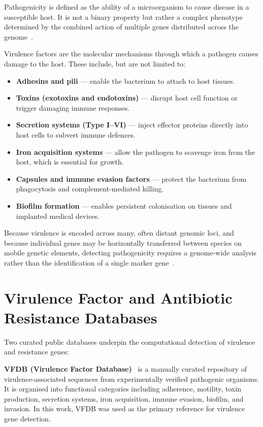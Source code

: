 Pathogenicity is defined as the ability of a microorganism to cause disease in a
susceptible host. It is not a binary property but rather a complex phenotype
determined by the combined action of multiple genes distributed across the
genome~\cite{TODO_pathogenicity_definition}.

Virulence factors are the molecular mechanisms through which a pathogen causes
damage to the host. These include, but are not limited to:

\begin{itemize}
    \item \textbf{Adhesins and pili} — enable the bacterium to attach to host tissues.
    \item \textbf{Toxins (exotoxins and endotoxins)} — disrupt host cell function or
          trigger damaging immune responses.
    \item \textbf{Secretion systems (Type I–VI)} — inject effector proteins directly
          into host cells to subvert immune defences.
    \item \textbf{Iron acquisition systems} — allow the pathogen to scavenge iron from
          the host, which is essential for growth.
    \item \textbf{Capsules and immune evasion factors} — protect the bacterium from
          phagocytosis and complement-mediated killing.
    \item \textbf{Biofilm formation} — enables persistent colonisation on tissues and
          implanted medical devices.
\end{itemize}

Because virulence is encoded across many, often distant genomic loci, and because
individual genes may be horizontally transferred between species on mobile genetic
elements, detecting pathogenicity requires a genome-wide analysis rather than
the identification of a single marker gene~\cite{TODO_HGT_virulence}.

\section{Virulence Factor and Antibiotic Resistance Databases}

Two curated public databases underpin the computational detection of virulence
and resistance genes:

\textbf{VFDB (Virulence Factor Database)}~\cite{TODO_VFDB_citation} is a manually curated
repository of virulence-associated sequences from experimentally verified pathogenic
organisms. It is organised into functional categories including adherence, motility,
toxin production, secretion systems, iron acquisition, immune evasion, biofilm, and
invasion. In this work, VFDB was used as the primary reference for virulence gene
detection.

